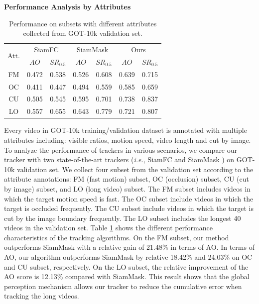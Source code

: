 \textbf{Performance Analysis by Attributes} 
\begin{table}
\centering
\caption{Performance on subsets with different attributes collected from GOT-10k validation set.}
\begin{tabular}{|c|c|c|c|c|c|c|}
\hline
\multirow{2}{*}{Att.} &
\multicolumn{2}{c|}{SiamFC} & \multicolumn{2}{c|}{SiamMask} &\multicolumn{2}{c|}{Ours} \\
\cline{2-7} & $AO$ & $SR_{0.5}$ & $AO$ & $SR_{0.5}$ & $AO$ & $SR_{0.5}$ \\
\hline
FM & 0.472 & 0.538 & 0.526 & 0.608 & 0.639 & 0.715 \\
\hline
OC & 0.411 & 0.447 & 0.494 & 0.559 & 0.585 & 0.659 \\
\hline
CU & 0.505 & 0.545 & 0.595 & 0.701 & 0.738 & 0.837 \\
\hline
LO & 0.557 & 0.655 & 0.643 & 0.779 & 0.721 & 0.807 \\
\hline
\end{tabular}
\label{table:attribute}
\end{table}
Every video in GOT-10k training/validation dataset is annotated with multiple attributes including: visible ratios, motion speed, video length and cut by image. To analyze the performance of trackers in various scenarios, we compare our tracker with two state-of-the-art trackers (\textit{i.e.}, SiamFC  \cite{bertinetto2016fully} and SiamMask \cite{Wang2018SiamMask}) on GOT-10k validation set. We collect four subset from the validation set according to the attribute annotations: FM (fast motion) subset, OC (occlusion) subset, CU (cut by image) subset, and LO (long video) subset. 
The FM subset includes videos in which the target motion speed is fast.
The OC subset include videos in which the target is occluded frequently.
The CU subset include videos in which the target is cut by the image boundary frequently.
The LO subset includes the longest 40 videos in the validation set.
Table \ref{table:attribute} shows the different performance characteristics of the tracking algorithms.
On the FM subset, our method outperforms SiamMask \cite{Wang2018SiamMask} with a relative gain of 21.48\% in terms of AO. 
In terms of AO, our algorithm outperforms SiamMask by relative 18.42\% and 24.03\% on OC and CU subset, respectively. 
On the LO subset, the relative improvement of the AO score is 12.13\% compared with SiamMask. This result shows that the global perception mechanism allows our tracker to reduce the cumulative error when tracking the long videos.

